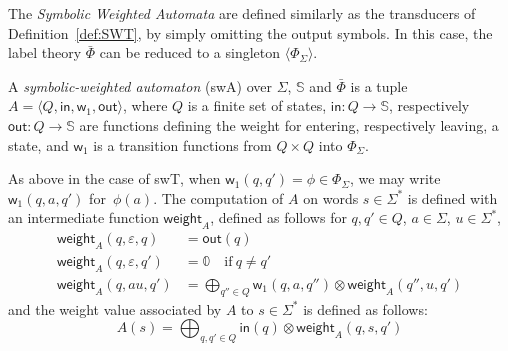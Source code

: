\documentclass[runningheads]{llncs}
\def\<#1>{\langle #1 \rangle}
\newcommand{\Semiring}{\mathbb{S}}
\newcommand{\zero}{\mathbb{0}}
\def\SWT{\textsf{swT}\xspace}
\def\SWA{\textsf{swA}\xspace}
\def\weight{\mathsf{weight}}
\def\wei{\mathsf{w}}
\def\init{\mathsf{in}}
\def\final{\mathsf{out}}
\begin{document}
\noindent
The \emph{Symbolic Weighted Automata} %
are defined similarly as the transducers of Definition~\ref{def:SWT}, 
by simply omitting the output symbols.
%
In this case, the label theory $\bar\Phi$ can be reduced to a singleton $\< \Phi_\Sigma>$.
%
\begin{definition} \label{def:SWA}
A \emph{symbolic-weighted automaton} (\SWA)
over $\Sigma$, $\Semiring$ and $\bar\Phi$
is a tuple
$A = \< Q, \init, {\wei_1}, \final >$,
where $Q$ is a finite set of states, 
$\mathsf{in} : Q \to \Semiring$, %
respectively $\mathsf{out} : Q \to \Semiring$  %
are functions defining the weight for entering, 
respectively leaving, a state, 
and ${\wei_1}$ is a transition functions 
from $Q \times Q$ into $\Phi_{\Sigma}$.
\end{definition}
%      
\noindent
As above in the case of \SWT, 
when $\wei_1(q, q') = \phi \in \Phi_\Sigma$, 
we may write $\wei_1(q, a, q')$ for~$\phi(a)$. 
The computation of $A$ on words $s \in \Sigma^*$
is defined with an intermediate function $\weight_A$, 
defined as follows for $q, q' \in Q$, $a \in \Sigma$, $u \in \Sigma^*$,
%
\begin{align}
\weight_A(q, \varepsilon, q) & = \final(q)\\
\weight_A(q, \varepsilon, q') & = \zero \quad \mathrm{if~} q \neq q'\nonumber\\
\weight_A(q, au, q') & =  \displaystyle\bigoplus_{q'' \in Q} 
    \wei_{1}(q, a, q'') \otimes \weight_A(q'', u, q')\nonumber
\label{eq:SWA-weight}
\end{align}
%
\noindent
and the weight value associated by $A$ to 
$s \in \Sigma^*$ is defined as follows: %
\begin{equation}
A(s)  = 
\displaystyle\bigoplus_{q, q' \in Q} \mathsf{in}(q) 
\mathop{\otimes} \weight_A(q, s, q') 
\label{eq:SWA-value}
\end{equation}


%
      
\end{document}

